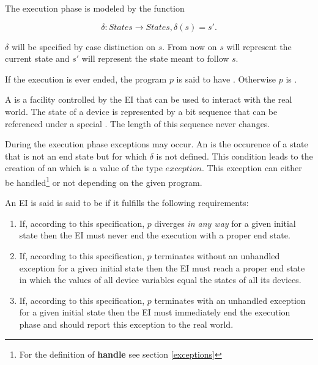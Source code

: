 The execution phase is modeled by the function

\[\delta: States \rightarrow States, \delta(s) = s'.\]

$\delta$ will be specified by case distinction on $s$. From now on $s$ will represent the current state and $s'$ will represent the state meant to follow $s$.

If the execution is ever ended, the program $p$ is said to have . Otherwise $p$ is .

A  is a facility controlled by the EI that can be used to interact with the real world. The state of a device is represented by a bit sequence that can be referenced under a special . The length of this sequence never changes.


During the execution phase exceptions may occur. An  is the occurence of a state that is not an end state but for which $\delta$ is not defined. This condition leads to the creation of an  which is a value of the type $exception$. This exception can either be handled\footnote{For the definition of \textbf{handle} see section \ref{exceptions}} or not depending on the given program.

\bigskip

An EI is said is said to be  if it fulfills the following requirements:

\begin{enumerate}
\item If, according to this specification, $p$ diverges \emph{in any way} for a given initial state then the EI must never end the execution with a proper end state.
\item If, according to this specification, $p$ terminates without an unhandled exception for a given initial state then the EI must reach a proper end state in which the values of all device variables equal the states of all its devices.
\item If, according to this specification, $p$ terminates with an unhandled exception for a given initial state then the EI must immediately end the execution phase and should report this exception to the real world.
\end{enumerate}

